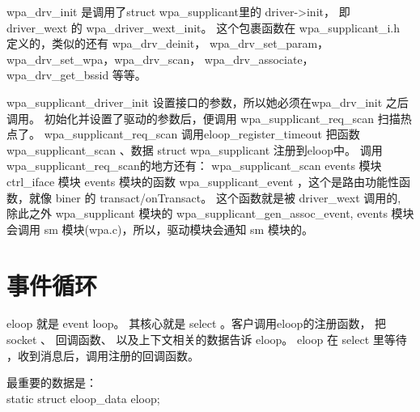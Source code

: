 \documentclass[a4paper,11pt,]{article}%
\begin{document}
wpa_drv_init 是调用了struct wpa_supplicant里的 driver->init， 
即 driver_wext 的 wpa_driver_wext_init。
这个包裹函数在 wpa_supplicant_i.h 定义的，类似的还有 wpa_drv_deinit，
wpa_drv_set_param， wpa_drv_set_wpa，wpa_drv_scan， wpa_drv_associate，
wpa_drv_get_bssid 等等。

wpa_supplicant_driver_init 设置接口的参数，所以她必须在wpa_drv_init 之后调用。
初始化并设置了驱动的参数后，便调用 wpa_supplicant_req_scan 扫描热点了。
wpa_supplicant_req_scan 调用eloop_register_timeout 把函数 wpa_supplicant_scan
、数据 struct wpa_supplicant 注册到eloop中\label{regscan}。
调用wpa_supplicant_req_scan的地方还有：
wpa_supplicant_scan
events 模块
ctrl_iface 模块
events 模块的函数 wpa_supplicant_event ，这个是路由功能性函数，就像 biner 的
transact/onTransact。 这个函数就是被 driver_wext 调用的, 除此之外
wpa_supplicant 模块的 wpa_supplicant_gen_assoc_event,  
events 模块会调用 sm 模块(wpa.c)，所以，驱动模块会通知 sm 模块的。

\section{事件循环}
eloop  就是 event loop。 其核心就是 select 。客户调用eloop的注册函数，
把socket 、 回调函数、 以及上下文相关的数据告诉 eloop。 eloop 在 select 里等待
，收到消息后，调用注册的回调函数。

最重要的数据是：\\
static struct eloop_data eloop;
\end{document}
